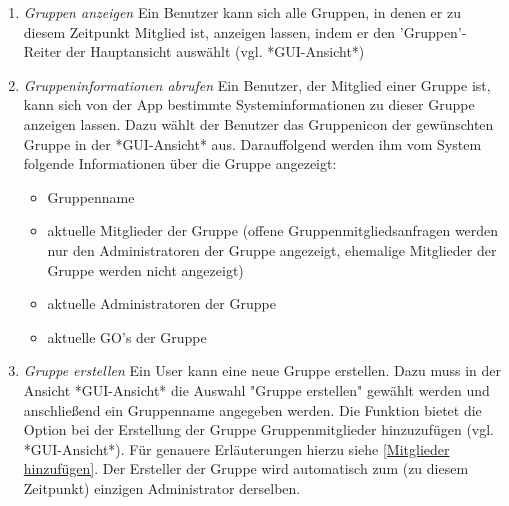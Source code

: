 \documentclass[parskip=full]{scrartcl}
\def\threedigits#1{%
  \ifnum#1<100 0\fi
  \ifnum#1<10 0\fi
  \number#1}
\begin{document}
\begin{enumerate}[label={\textbf{/F\protect\threedigits{\theenumi}0/}}, leftmargin=*, resume]
	\item \textit{Gruppen anzeigen} %
	Ein Benutzer kann sich alle Gruppen, in denen er zu diesem Zeitpunkt Mitglied ist, anzeigen lassen, indem er den 'Gruppen'-Reiter der \gls{Hauptansicht} auswählt (vgl. *GUI-Ansicht*)
	
	\item \textit{Gruppeninformationen abrufen} \label{Gruppeninfo anzeigen} %
	Ein Benutzer, der Mitglied einer Gruppe ist, kann sich von der App bestimmte Systeminformationen zu dieser Gruppe anzeigen lassen. Dazu wählt der Benutzer das Gruppenicon der gewünschten Gruppe in der *GUI-Ansicht* aus. Darauffolgend werden ihm vom System folgende Informationen über die Gruppe angezeigt:
	\begin{itemize}
		\item Gruppenname
		\item aktuelle Mitglieder der Gruppe (offene Gruppenmitgliedsanfragen werden nur den Administratoren der Gruppe angezeigt, ehemalige Mitglieder der Gruppe werden nicht angezeigt)
		\item aktuelle Administratoren der Gruppe
		\item aktuelle \gls{GO}'s der Gruppe %
	\end{itemize}
	
	\item \textit{Gruppe erstellen}
	Ein User kann eine neue Gruppe erstellen. Dazu muss in der Ansicht *GUI-Ansicht* die Auswahl "Gruppe erstellen" gewählt werden und anschließend ein Gruppenname angegeben werden. Die Funktion bietet die Option bei der Erstellung der Gruppe Gruppenmitglieder hinzuzufügen (vgl. *GUI-Ansicht*). Für genauere Erläuterungen hierzu siehe \ref{Mitglieder hinzufügen}.
	Der Ersteller der Gruppe wird automatisch zum (zu diesem Zeitpunkt) einzigen Administrator derselben.
	

\end{enumerate}
\end{document}
